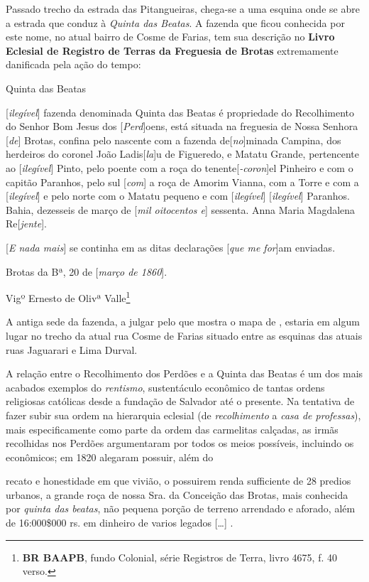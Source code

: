 Passado trecho da estrada das Pitangueiras, chega-se a uma esquina onde se abre a estrada que conduz à \textit{Quinta das Beatas}. A fazenda que ficou conhecida por este nome, no atual bairro de Cosme de Farias, tem sua descrição no \textbf{Livro Eclesial de Registro de Terras da Freguesia de Brotas} extremamente danificada pela ação do tempo:

\begin{citacao}
Quinta das Beatas

[\textit{ilegível}] fazenda denominada Quinta das Beatas é propriedade do Recolhimento do Senhor Bom Jesus dos [\textit{Perd}]oens, está situada na freguesia de Nossa Senhora [\textit{de}] Brotas, confina pelo nascente com a fazenda de[\textit{no}]minada Campina, dos herdeiros do coronel João Ladis[\textit{la}]u de Figueredo, e Matatu Grande, pertencente ao [\textit{ilegível}] Pinto, pelo poente com a roça do tenente[\textit{-coron}]el Pinheiro e com o capitão Paranhos, pelo sul [\textit{com}] a roça de Amorim Vianna, com a Torre e com a [\textit{ilegível}] e pelo norte com o Matatu pequeno e com [\textit{ilegível}] [\textit{ilegível}] Paranhos. Bahia, dezesseis de março de [\textit{mil oitocentos e}] sessenta. Anna Maria Magdalena Re[\textit{jente}]. 

[\textit{E nada mais}] se continha em as ditas declarações [\textit{que me for}]am enviadas.

Brotas da Bª, 20 de [\textit{março de 1860}].

Vigº Ernesto de Olivª Valle\footnote{\textbf{BR BAAPB}, fundo Colonial, série Registros de Terra, livro 4675, f. 40 verso.}
\end{citacao}

A antiga sede da fazenda, a julgar pelo que mostra o mapa de , estaria em algum lugar no trecho da atual rua Cosme de Farias situado entre as esquinas das atuais ruas Jaguarari e Lima Durval.

A relação entre o Recolhimento dos Perdões e a Quinta das Beatas é um dos mais acabados exemplos do \textit{rentismo}, sustentáculo econômico de tantas ordens religiosas católicas desde a fundação de Salvador até o presente. Na tentativa de fazer subir sua ordem na hierarquia eclesial (de \textit{recolhimento} a \textit{casa de professas}), mais especificamente como parte da ordem das carmelitas calçadas, as irmãs recolhidas nos Perdões argumentaram por todos os meios possíveis, incluindo os econômicos; em 1820 alegaram possuir, além do 

\begin{citacao}
recato e honestidade em que vivião, o possuirem renda sufficiente de 28 predios urbanos, a grande roça de nossa Sra. da Conceição das Brotas, mais conhecida por \textit{quinta das beatas}, não pequena porção de terreno arrendado e aforado, além de 16:000\$000 rs. em dinheiro de varios legados [\dots] \cite[p.~231]{accioli_memorias5_1937}.
\end{citacao}

